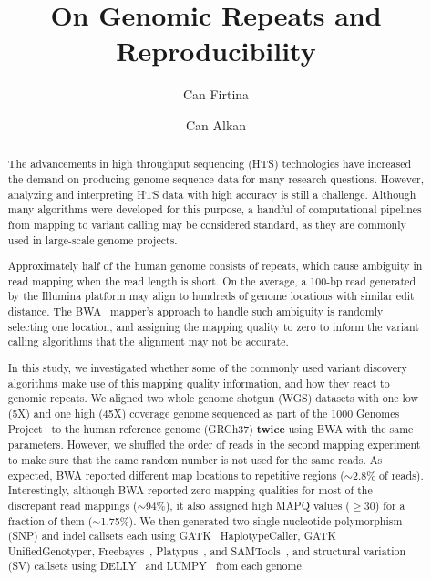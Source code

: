 \documentclass[10pt,a4paper]{article}
\date{}
\def\titulo#1{\title{#1}}
\begin{document}
\titulo{On Genomic Repeats and Reproducibility}

\author[1]{Can Firtina}
\author[1]{Can Alkan}

\maketitle
\thispagestyle{empty}


\begin{abstract}
The advancements in high throughput sequencing (HTS) technologies have increased the demand on producing  genome sequence data for many research questions. However, analyzing and interpreting HTS data with high accuracy is still a challenge. 
Although many algorithms were developed for this purpose, a handful of computational pipelines from mapping to variant calling may be considered standard, as they are commonly used in large-scale genome projects.

Approximately half of the human genome consists of repeats, which cause ambiguity in read mapping when the read length is short. On the average, a 100-bp read generated by the Illumina platform may align to hundreds of genome locations with similar edit distance. 
The BWA~\cite{Li2009a} mapper's  approach to handle such ambiguity is randomly selecting one location, and assigning the mapping quality to zero to inform the variant calling algorithms that the alignment may not be accurate. 

In this study, we investigated whether some of the commonly used variant discovery algorithms
make use of this mapping quality information, and how they react to genomic repeats.
We aligned two whole genome shotgun (WGS) datasets with one low (5X) and one high (45X) coverage genome
sequenced as part of the 1000 Genomes Project~\cite{1000GP2012} to the human reference genome (GRCh37) {\bf twice} using BWA with the same parameters. However, we shuffled the order of reads in the second mapping experiment to make sure that the same random number is not used for the same reads.
As expected, BWA reported different map locations to repetitive regions ($\sim$2.8\% of reads). Interestingly, although BWA reported zero mapping qualities for 
most of the discrepant read mappings ($\sim$94\%), it also assigned high MAPQ values ($\geq$30) for a fraction of them ($\sim$1.75\%). 
We then generated two single nucleotide polymorphism (SNP) and indel callsets each using GATK~\cite{DePristo2011} HaplotypeCaller, GATK UnifiedGenotyper, Freebayes~\cite{Garrison2012}, Platypus~\cite{Rimmer2014}, and SAMTools~\cite{Li2009b}, and structural variation (SV)
callsets using DELLY~\cite{Rausch2012} and LUMPY~\cite{Layer2014} from each genome.


\end{abstract}
\end{document}
